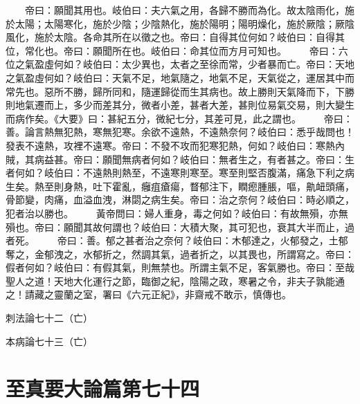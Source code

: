 　　帝曰：願聞其用也。岐伯曰：夫六氣之用，各歸不勝而為化。故太陰雨化，施於太陽；太陽寒化，施於少陰；少陰熱化，施於陽明；陽明燥化，施於厥陰；厥陰風化，施於太陰。各命其所在以徵之也。帝曰：自得其位何如？岐伯曰：自得其位，常化也。帝曰：願聞所在也。岐伯曰：命其位而方月可知也。
　　帝曰：六位之氣盈虛何如？岐伯曰：太少異也，太者之至徐而常，少者暴而亡。帝曰：天地之氣盈虛何如？岐伯曰：天氣不足，地氣隨之，地氣不足，天氣從之，運居其中而常先也。惡所不勝，歸所同和，隨運歸從而生其病也。故上勝則天氣降而下，下勝則地氣遷而上，多少而差其分，微者小差，甚者大差，甚則位易氣交易，則大變生而病作矣。《大要》曰：甚紀五分，微紀七分，其差可見，此之謂也。
　　帝曰：善。論言熱無犯熱，寒無犯寒。余欲不遠熱，不遠熱奈何？岐伯曰：悉乎哉問也！發表不遠熱，攻裡不遠寒。帝曰：不發不攻而犯寒犯熱，何如？岐伯曰：寒熱內賊，其病益甚。帝曰：願聞無病者何如？岐伯曰：無者生之，有者甚之。帝曰：生者何如？岐伯曰：不遠熱則熱至，不遠寒則寒至。寒至則堅否腹滿，痛急下利之病生矣。熱至則身熱，吐下霍亂，癰疽瘡瘍，瞀郁注下，瞤瘛腫脹，嘔，鼽衄頭痛，骨節變，肉痛，血溢血洩，淋閟之病生矣。帝曰：治之奈何？岐伯曰：時必順之，犯者治以勝也。
　　黃帝問曰：婦人重身，毒之何如？岐伯曰：有故無殞，亦無殞也。帝曰：願聞其故何謂也？岐伯曰：大積大聚，其可犯也，衰其大半而止，過者死。
　　帝曰：善。郁之甚者治之奈何？岐伯曰：木郁達之，火郁發之，土郁奪之，金郁洩之，水郁折之，然調其氣，過者折之，以其畏也，所謂寫之。帝曰：假者何如？岐伯曰：有假其氣，則無禁也。所謂主氣不足，客氣勝也。帝曰：至哉聖人之道！天地大化運行之節，臨御之紀，陰陽之政，寒暑之令，非夫子孰能通之！請藏之靈蘭之室，署曰《六元正紀》，非齋戒不敢示，慎傳也。


刺法論七十二（亡）

本病論七十三（亡）

\section{至真要大論篇第七十四}

